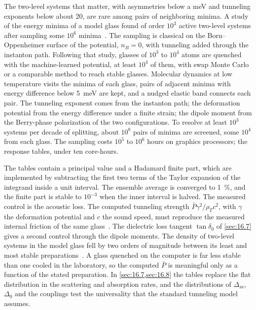 The two-level systems that matter, with asymmetries below a meV and tunneling exponents below about 20, are rare among pairs of neighboring minima. A study of the energy minima of a model glass found of order $10^3$ active two-level systems after sampling some $10^6$ minima~\cite{khomenko2020depletion}. The sampling is classical on the Born--Oppenheimer surface of the potential, $n_B = 0$, with tunneling added through the instanton path. Following that study, glasses of $10^3$ to $10^4$ atoms are quenched with the machine-learned potential, at least $10^4$ of them, with swap Monte Carlo or a comparable method to reach stable glasses. Molecular dynamics at low temperature visits the minima of each glass, pairs of adjacent minima with energy difference below \SI{5}{meV} are kept, and a nudged elastic band connects each pair. The tunneling exponent comes from the instanton path; the deformation potential from the energy difference under a finite strain; the dipole moment from the Berry-phase polarization of the two configurations. To resolve at least $10^3$ systems per decade of splitting, about $10^8$ pairs of minima are screened, some $10^4$ from each glass. The sampling costs $10^5$ to $10^6$ hours on graphics processors; the response tables, under ten core-hours.

The tables contain a principal value and a Hadamard finite part, which are implemented by subtracting the first two terms of the Taylor expansion of the integrand inside a unit interval. The ensemble average is converged to \SI{1}{\percent}, and the finite part is stable to $10^{-3}$ when the inner interval is halved. The measured control is the acoustic loss. The computed tunneling strength $\bar P\gamma^2/\rho_Tc^2$, with $\gamma$ the deformation potential and $c$ the sound speed, must reproduce the measured internal friction of the same glass~\cite{phillips1987two}. The dielectric loss tangent $\tan\delta_0$ of \cref{sec:16.7} gives a second control through the dipole moments. The density of two-level systems in the model glass fell by two orders of magnitude between its least and most stable preparations~\cite{khomenko2020depletion}. A glass quenched on the computer is far less stable than one cooled in the laboratory, so the computed $\bar P$ is meaningful only as a function of the stated preparation. In \cref{sec:16.7,sec:16.8} the tables replace the flat distribution in the scattering and absorption rates, and the distributions of $\Delta_{\mathrm{as}}$, $\Delta_0$ and the couplings test the universality that the standard tunneling model assumes.

